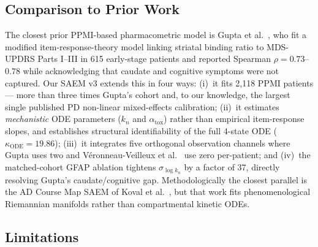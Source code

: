 \subsection{Comparison to Prior Work}
\label{subsec:ch9-6-prior-work}

The closest prior PPMI-based pharmacometric model is Gupta et al.~\cite{gupta2025}, who fit a modified item-response-theory model linking striatal binding ratio to MDS-UPDRS Parts I--III in 615 early-stage patients and reported Spearman $\rho = 0.73$--$0.78$ while acknowledging that caudate and cognitive symptoms were not captured. Our SAEM v3 extends this in four ways: (i)~it fits 2,118 PPMI patients --- more than three times Gupta's cohort and, to our knowledge, the largest single published PD non-linear mixed-effects calibration; (ii)~it estimates \emph{mechanistic} ODE parameters ($k_n$ and $\alpha_\text{tox}$) rather than empirical item-response slopes, and establishes structural identifiability of the full 4-state ODE ($\kappa_\text{ODE} = 19.86$); (iii)~it integrates five orthogonal observation channels where Gupta uses two and Véronneau-Veilleux et al.~\cite{veronneau2020chaos,veronneau2020integrative} use zero per-patient; and (iv)~the matched-cohort GFAP ablation tightens $\sigma_{\log k_n}$ by a factor of 37, directly resolving Gupta's caudate/cognitive gap. Methodologically the closest parallel is the AD Course Map SAEM of Koval et al.~\cite{koval2021admap}, but that work fits phenomenological Riemannian manifolds rather than compartmental kinetic ODEs.

\subsection{Limitations}
\label{subsec:ch9-6-limitations}

